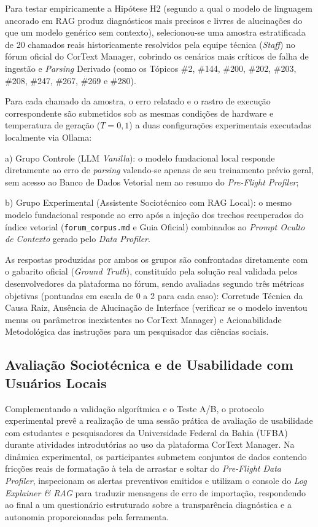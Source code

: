 \documentclass[
	oneside,
	a4paper,
	12pt,
	chapter=TITLE,
	section=TITLE,
	english,
	brazilian
]{abntex2}
\begin{document}
Para testar empiricamente a Hipótese H2 (segundo a qual o modelo de linguagem ancorado em RAG produz diagnósticos mais precisos e livres de alucinações do que um modelo genérico sem contexto), selecionou-se uma amostra estratificada de 20 chamados reais historicamente resolvidos pela equipe técnica (\textit{Staff}) no fórum oficial do CorText Manager, cobrindo os cenários mais críticos de falha de ingestão e \textit{Parsing} Derivado (como os Tópicos \#2, \#144, \#200, \#202, \#203, \#208, \#247, \#267, \#269 e \#280).

Para cada chamado da amostra, o erro relatado e o rastro de execução correspondente são submetidos sob as mesmas condições de hardware e temperatura de geração ($T = 0,1$) a duas configurações experimentais executadas localmente via Ollama:

\par\indent a) Grupo Controle (LLM \textit{Vanilla}): o modelo fundacional local responde diretamente ao erro de \textit{parsing} valendo-se apenas de seu treinamento prévio geral, sem acesso ao Banco de Dados Vetorial nem ao resumo do \textit{Pre-Flight Profiler};
\par\indent b) Grupo Experimental (Assistente Sociotécnico com RAG Local): o mesmo modelo fundacional responde ao erro após a injeção dos trechos recuperados do índice vetorial (\texttt{forum\_\allowbreak corpus.\allowbreak md} e Guia Oficial) combinados ao \textit{Prompt Oculto de Contexto} gerado pelo \textit{Data Profiler}.

As respostas produzidas por ambos os grupos são confrontadas diretamente com o gabarito oficial (\textit{Ground Truth}), constituído pela solução real validada pelos desenvolvedores da plataforma no fórum, sendo avaliadas segundo três métricas objetivas (pontuadas em escala de 0 a 2 para cada caso): Corretude Técnica da Causa Raiz, Ausência de Alucinação de Interface (verificar se o modelo inventou menus ou parâmetros inexistentes no CorText Manager) e Acionabilidade Metodológica das instruções para um pesquisador das ciências sociais.

\FloatBarrier
\subsection{Avaliação Sociotécnica e de Usabilidade com Usuários Locais}\label{sec:avaliacao_sociotecnica_e_de_usabilidade_}


Complementando a validação algorítmica e o Teste A/B, o protocolo experimental prevê a realização de uma sessão prática de avaliação de usabilidade com estudantes e pesquisadores da Universidade Federal da Bahia (UFBA) durante atividades introdutórias ao uso da plataforma CorText Manager. Na dinâmica experimental, os participantes submetem conjuntos de dados contendo fricções reais de formatação à tela de arrastar e soltar do \textit{Pre-Flight Data Profiler}, inspecionam os alertas preventivos emitidos e utilizam o console do \textit{Log Explainer \& RAG} para traduzir mensagens de erro de importação, respondendo ao final a um questionário estruturado sobre a transparência diagnóstica e a autonomia proporcionadas pela ferramenta.
\end{document}
